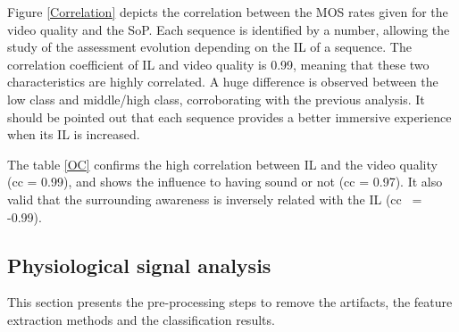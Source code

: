 Figure \ref{Correlation} depicts the correlation between the \ac{MOS} rates given for the video quality and the \ac{SoP}. Each sequence is identified by a number, allowing the study of the assessment evolution depending on the \ac{IL} of a sequence.
The correlation coefficient of \ac{IL} and video quality is 0.99, meaning that these two characteristics are highly correlated. A huge difference is observed between the low class and middle/high class, corroborating with the previous analysis. It should be pointed out that each sequence provides a better immersive experience when its \ac{IL} is increased.


\begin{table}[h]
\end{table}

The table \ref{OC} confirms the high correlation between \ac{IL} and the video quality (cc = 0.99), and shows the influence to having sound or not (cc = 0.97). It also valid that the surrounding awareness is inversely related with the \ac{IL} (cc ~= -0.99).


\subsection{Physiological signal analysis}
This section presents the pre-processing steps to remove the artifacts, the feature extraction methods and the classification results.

